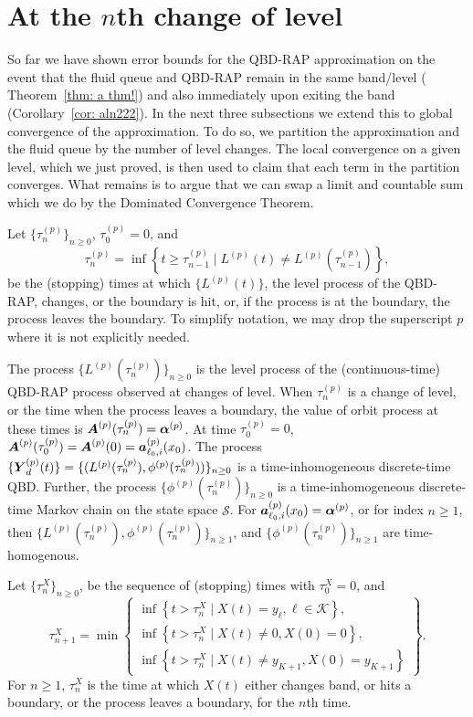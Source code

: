 \section{At the \(n\)th change of level}\label{sec: nth change}

So far we have shown error bounds for the QBD-RAP approximation on the event that the fluid queue and QBD-RAP remain in the same band/level (%
Theorem~\ref{thm: a thm!}) and also immediately upon exiting the band (Corollary~\ref{cor: aln222}). In the next three subsections we extend this to global convergence of the approximation. To do so, we partition the approximation and the fluid queue by the number of level changes. The local convergence on a given level, which we just proved, is then used to claim that each term in the partition converges. What remains is to argue that we can swap a limit and countable sum which we do by the Dominated Convergence Theorem. 

Let \(\{\tau_n^{(p)}\}_{n\geq 0}\), \(\tau_0^{(p)}=0\), and
\[\tau_{n}^{(p)} = \inf\left\{t\geq \tau_{n-1}^{(p)} \mid L^{(p)}(t)\neq L^{(p)}(\tau_{n-1}^{(p)})\right\},\]
be the (stopping) times at which \(\{L^{(p)}(t)\}\), the level process of the QBD-RAP, changes, or the boundary is hit, or, if the process is at the boundary, the process leaves the boundary. To simplify notation, we may drop the superscript \(p\) where it is not explicitly needed. 

The process \(\{L^{(p)}(\tau_n^{(p)})\}_{n\geq 0}\) is the level process of the (continuous-time) QBD-RAP process observed at changes of level. When \(\tau_n^{(p)}\) is a change of level, or the time when the process leaves a boundary, the value of orbit process at these times is \(\boldsymbol A^{(p)}(\tau_n^{(p)}) = \boldsymbol \alpha^{(p)}\). At time \(\tau_0^{(p)} =0\), \(\boldsymbol A^{(p)}(\tau_0^{(p)})=\boldsymbol A^{(p)}(0) = \boldsymbol   a_{\ell_0,i}^{(p)}(x_0)\). The process \(\{\boldsymbol Y_d^{(p)}(t)\} = \{(L^{(p)}(\tau_n^{(p)}),\phi^{(p)}(\tau_n^{(p)}))\}_{n\geq 0}\) is a time-inhomogeneous discrete-time QBD. Further, the process \(\{\phi^{(p)}(\tau_n^{(p)})\}_{n\geq 0}\) is a time-inhomogeneous discrete-time Markov chain on the state space \(\mathcal S\). For \(\boldsymbol   a_{\ell_0,i}^{(p)}(x_0) = \boldsymbol \alpha^{(p)}\), or for index \(n\geq 1\), then \(\{L^{(p)}(\tau_n^{(p)}),\phi^{(p)}(\tau_n^{(p)})\}_{n\geq 1}\), and \(\{\phi^{(p)}(\tau_n^{(p)})\}_{n\geq 1}\) are time-homogenous.

Let \(\{\tau_n^X\}_{n\geq 0}\), be the sequence of (stopping) times with \(\tau_0^X=0\), and 
\[\tau_{n+1}^X = \min\left\{\begin{array}{c}\inf\left\{t>\tau_n^X\mid X(t)=y_{\ell}, \ell\in\mathcal K\right\}, \\ \inf\left\{t>\tau_n^X \mid X(t) \neq 0, X(0)=0\right\}, \\ \inf\left\{t>\tau_n^X \mid X(t) \neq y_{K+1}, X(0)=y_{K+1}\right\} \end{array} \right\}.\]
For \(n\geq 1\), \(\tau_n^X\) is the time at which \(X(t)\) either changes band, or hits a boundary, or the process leaves a boundary, for the \(n\)th time. 

